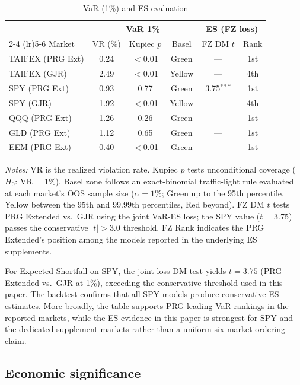 \documentclass[11pt,a4paper]{article}
\begin{document}
\begin{table}[htbp]
\centering
\caption{VaR (1\%) and ES evaluation}
\label{tab:var_es}
\small
\begin{tabular}{lccccc}
\toprule
 & \multicolumn{3}{c}{VaR 1\%} & \multicolumn{2}{c}{ES (FZ loss)} \\
\cmidrule(lr){2-4} \cmidrule(lr){5-6}
Market & VR (\%) & Kupiec $p$ & Basel & FZ DM $t$ & Rank \\
\midrule
TAIFEX (PRG Ext)   & 0.24 & $<$0.01 & Green & --- & 1st \\
TAIFEX (GJR)       & 2.49 & $<$0.01 & Yellow & --- & 4th \\
SPY (PRG Ext)      & 0.93 & 0.77 & Green & 3.75$^{***}$ & 1st \\
SPY (GJR)          & 1.92 & $<$0.01 & Yellow & --- & 4th \\
QQQ (PRG Ext)      & 1.26 & 0.26 & Green & --- & 1st \\
GLD (PRG Ext)      & 1.12 & 0.65 & Green & --- & 1st \\
EEM (PRG Ext)      & 0.40 & $<$0.01 & Green & --- & 1st \\
\bottomrule
\end{tabular}
\begin{flushleft}
\footnotesize
\emph{Notes:} VR is the realized violation rate. Kupiec $p$ tests unconditional coverage ($H_0$: VR = 1\%). Basel zone follows an exact-binomial traffic-light rule evaluated at each market's OOS sample size ($\alpha=1\%$; Green up to the 95th percentile, Yellow between the 95th and 99.99th percentiles, Red beyond). FZ DM $t$ tests PRG Extended vs.\ GJR using the \citet{Fissler2016} joint VaR-ES loss; the SPY value ($t = 3.75$) passes the conservative $|t|>3.0$ threshold. FZ Rank indicates the PRG Extended's position among the models reported in the underlying ES supplements.
\end{flushleft}
\end{table}

For Expected Shortfall on SPY, the \citet{Fissler2016} joint loss DM test yields $t = 3.75$ (PRG Extended vs.\ GJR at 1\%), exceeding the conservative threshold used in this paper. The \citet{Acerbi2014} backtest confirms that all SPY models produce conservative ES estimates. More broadly, the table supports PRG-leading VaR rankings in the reported markets, while the ES evidence in this paper is strongest for SPY and the dedicated supplement markets rather than a uniform six-market ordering claim.

\subsection{Economic significance}
\end{document}
